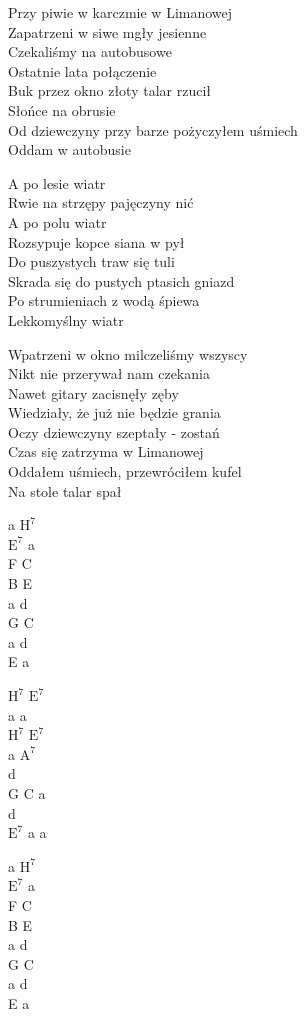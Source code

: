 \begin{text}
    Przy piwie w karczmie w Limanowej\\
    Zapatrzeni w siwe mgły jesienne\\
    Czekaliśmy na autobusowe\\
    Ostatnie lata połączenie\\
    Buk przez okno złoty talar rzucił\\
    Słońce na obrusie\\
    Od dziewczyny przy barze pożyczyłem uśmiech\\
    Oddam w autobusie

    \vin A po lesie wiatr\\
    \vin Rwie na strzępy pajęczyny nić\\
    \vin A po polu wiatr\\
    \vin Rozsypuje kopce siana w pył\\
    \vin Do puszystych traw się tuli\\
    \vin Skrada się do pustych ptasich gniazd\\
    \vin Po strumieniach z wodą śpiewa\\
    \vin Lekkomyślny wiatr

    Wpatrzeni w okno milczeliśmy wszyscy\\
    Nikt nie przerywał nam czekania\\
    Nawet gitary zacisnęły zęby\\
    Wiedziały, że już nie będzie grania\\
    Oczy dziewczyny szeptały - zostań\\
    Czas się zatrzyma w Limanowej\\
    Oddałem uśmiech, przewróciłem kufel\\
    Na stole talar spał
\end{text}
\begin{chord}
    a $\mathrm{H^7}$\\
    $\mathrm{E^7}$ a\\
    F C\\
    B E\\
    a d\\
    G C\\
    a d\\
    E a

    $\mathrm{H^7}$ $\mathrm{E^7}$\\
    a a\\
    $\mathrm{H^7}$ $\mathrm{E^7}$\\
    a $\mathrm{A^7}$\\
    d\\
    G C a\\
    d\\
    $\mathrm{E^7}$ a a

    a $\mathrm{H^7}$\\
    $\mathrm{E^7}$ a\\
    F C\\
    B E\\
    a d\\
    G C\\
    a d\\
    E a
\end{chord}
